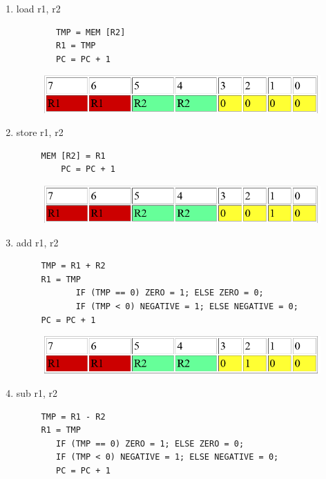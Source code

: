 \documentclass[../notes.tex]{subfiles}
\begin{document}
\begin{enumerate}
	\item load r1, r2
		\begin{listing}[H]
		\begin{verbatim}
		TMP = MEM [R2]
		R1 = TMP
		PC = PC + 1
		\end{verbatim}
		\end{listing}

		\begin{figure}[H]
			\centering
			\includegraphics[width=0.8\linewidth]{img/image_2022-11-03-14-54-07.png}
		\end{figure}
		
	\item store r1, r2
		\begin{listing}[H]
		\begin{verbatim}
     MEM [R2] = R1
		 PC = PC + 1
		\end{verbatim}
		\end{listing}
		\begin{figure}[H]
			\centering
			\includegraphics[width=0.8\linewidth]{img/image_2022-11-03-14-54-23.png}
		\end{figure}
	\item add r1, r2
		\begin{listing}[H]
		\begin{verbatim}
     TMP = R1 + R2
     R1 = TMP
			IF (TMP == 0) ZERO = 1; ELSE ZERO = 0;
			IF (TMP < 0) NEGATIVE = 1; ELSE NEGATIVE = 0;
     PC = PC + 1
		\end{verbatim}
		\end{listing}
		\begin{figure}[H]
			\centering
			\includegraphics[width=0.8\linewidth]{img/image_2022-11-03-14-54-35.png}
		\end{figure}
	\item sub r1, r2
		\begin{listing}[H]
		\begin{verbatim}
     TMP = R1 - R2
     R1 = TMP
		IF (TMP == 0) ZERO = 1; ELSE ZERO = 0;
		IF (TMP < 0) NEGATIVE = 1; ELSE NEGATIVE = 0;
		PC = PC + 1
		\end{verbatim}
		\end{listing}


\end{enumerate}
\end{document}
